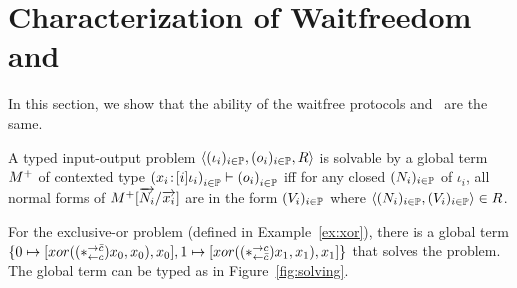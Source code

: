 \section{Characterization of Waitfreedom and \lgd}
\label{comparison}

In this section,
we show that the ability of the waitfree protocols and \lgd\, are the same.
\begin{definition}
 \label{def:solvable}
 A typed input-output problem
 $\langle{(\iota_i)_{i\in \mathbb{P}}, (o_i)_{i\in \mathbb{P}}, R}\rangle$ is
 solvable by a global term
 ${M}^+$ of contexted type
 $\left({x_i} \mathord{\colon\kern -2pt}{[i]\iota_i}\right)_{i\in\mathbb{P}}
 \vdash\left(o_i\right)_{i\in \mathbb{P}}$ iff
 for any closed $(N_i)_{i\in \mathbb{P}}$ of $\iota_i$,
 all normal forms of ${M}^+[\overrightarrow{N_i}/\overrightarrow{x_i}]$
 are in the form $(V_i)_{i\in\mathbb{P}}$
 where $\langle{(N_i)_{i\in \mathbb{P}}, (V_i)_{i\in \mathbb{P}}}\rangle\in R$.
\end{definition}

 \begin{example}
  For the exclusive-or problem (defined in Example~\ref{ex:xor}), there is
  a global term $\{0\mapsto [{xor((\ast^{\rightarrow {\bar{c}}}_{\leftarrow{c}})x_0,x_0),x_0}],
  1\mapsto[{xor((\ast^{\rightarrow {c}}_{\leftarrow{\bar{c}}})x_1,x_1),x_1}]\}$ that solves the
  problem.
  The global term can be typed as in Figure~\ref{fig:solving}.
 \end{example}

